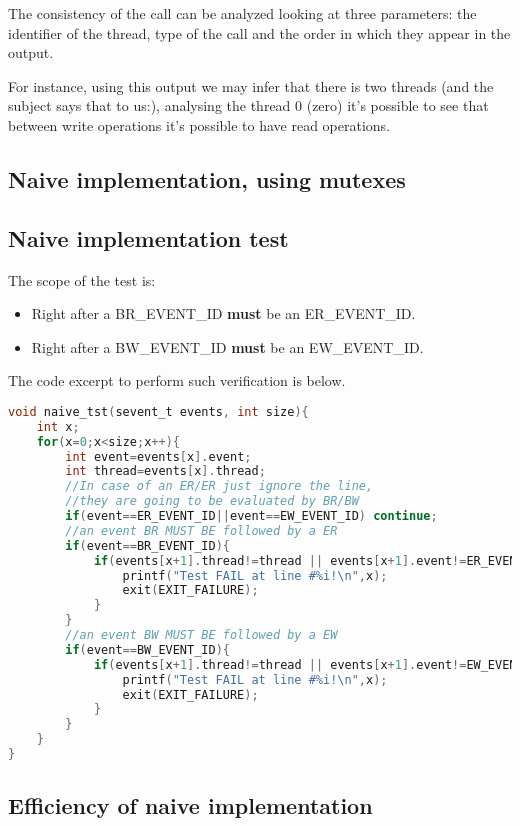 \documentclass{article}
\begin{document}
		The consistency of the call can be analyzed looking at three parameters: the identifier of 
		the thread, type of the call and the order in which they appear in the output.

		For instance, using this output we may infer that there is two threads (and the subject says 
		that to us:), analysing the thread 0 (zero) it's possible to see that between write operations
		it's possible to have read operations.

	\subsection{Naive implementation, using mutexes}

		

	\subsection{Naive implementation test}

		The scope of the test is:
		\begin{itemize}
		\item Right after a \uppercase{br\_event\_id} \textbf{must} be an \uppercase{er\_event\_id}.
		\item Right after a \uppercase{bw\_event\_id} \textbf{must} be an \uppercase{ew\_event\_id}.
		\end{itemize}

		The code excerpt to perform such verification is below. 

		\begin{lstlisting}[language=C]
void naive_tst(sevent_t events, int size){
	int x;
	for(x=0;x<size;x++){
		int event=events[x].event;
		int thread=events[x].thread;
		//In case of an ER/ER just ignore the line, 
		//they are going to be evaluated by BR/BW
		if(event==ER_EVENT_ID||event==EW_EVENT_ID) continue;
		//an event BR MUST BE followed by a ER
		if(event==BR_EVENT_ID){
			if(events[x+1].thread!=thread || events[x+1].event!=ER_EVENT_ID){
				printf("Test FAIL at line #%i!\n",x);
				exit(EXIT_FAILURE);
			}
		}	
		//an event BW MUST BE followed by a EW
		if(event==BW_EVENT_ID){
			if(events[x+1].thread!=thread || events[x+1].event!=EW_EVENT_ID){
				printf("Test FAIL at line #%i!\n",x);
				exit(EXIT_FAILURE);
			}
		}
	}
}		
		\end{lstlisting}

	\subsection{Efficiency of naive implementation}
\end{document}
